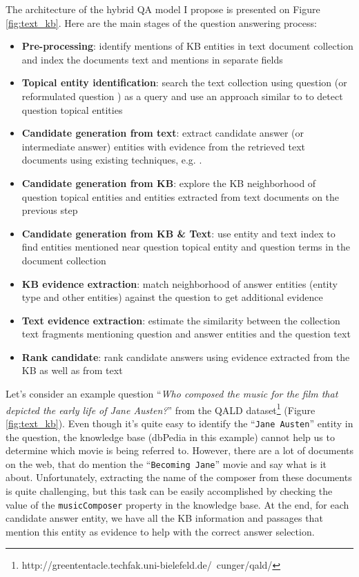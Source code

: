 The architecture of the hybrid QA model I propose is presented on Figure \ref{fig:text_kb}.
Here are the main stages of the question answering process:
\begin{itemize}
\setlength\itemsep{0em}
\item \textbf{Pre-processing}: identify mentions of KB entities in text document collection and index the documents text and mentions in separate fields
\item \textbf{Topical entity identification}: search the text collection using question (or reformulated question \cite{AgichteinLG01}) as a query and use an approach similar to \cite{cornolti2014smaph} to detect question topical entities
\item \textbf{Candidate generation from text}: extract candidate answer (or intermediate answer) entities with evidence from the retrieved text documents using existing techniques, e.g. \cite{tsai2015web}.
\item \textbf{Candidate generation from KB}: explore the KB neighborhood of question topical entities and entities extracted from text documents on the previous step
\item \textbf{Candidate generation from KB \& Text}: use entity and text index to find entities mentioned near question topical entity and question terms in the document collection
\item \textbf{KB evidence extraction}: match neighborhood of answer entities (entity type and other entities) against the question to get additional evidence
\item \textbf{Text evidence extraction}: estimate the similarity between the collection text fragments mentioning question and answer entities and the question text
\item \textbf{Rank candidate}: rank candidate answers using evidence extracted from the KB as well as from text
\end{itemize}

Let's consider an example question ``\textit{Who composed the music for the film that depicted the early life of Jane Austen?}'' from the QALD dataset\footnote{http://greententacle.techfak.uni-bielefeld.de/~cunger/qald/} (Figure \ref{fig:text_kb}).
Even though it's quite easy to identify the ``\texttt{Jane Austen}'' entity in the question, the knowledge base (dbPedia in this example) cannot help us to determine which movie is being referred to.
However, there are a lot of documents on the web, that do mention the ``\texttt{Becoming Jane}'' movie and say what is it about.
Unfortunately, extracting the name of the composer from these documents is quite challenging, but this task can be easily accomplished by checking the value of the \texttt{musicComposer} property in the knowledge base.
At the end, for each candidate answer entity, we have all the KB information and passages that mention this entity as evidence to help with the correct answer selection.

